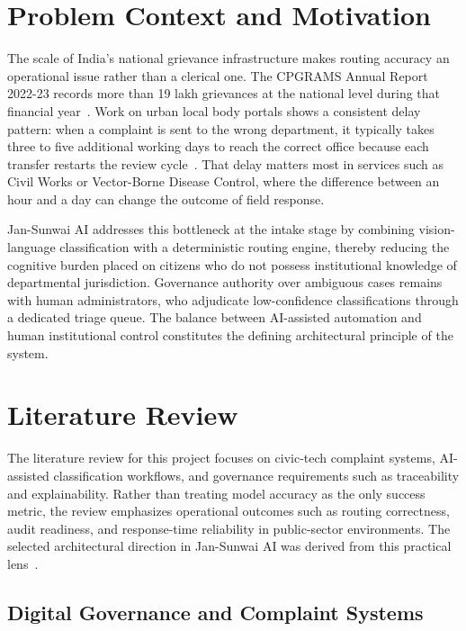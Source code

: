 \section{Problem Context and Motivation}

The scale of India's national grievance infrastructure makes routing accuracy an operational issue rather than a clerical one. The CPGRAMS Annual Report 2022-23 records more than 19 lakh grievances at the national level during that financial year~\cite{cpgrams_report}. Work on urban local body portals shows a consistent delay pattern: when a complaint is sent to the wrong department, it typically takes three to five additional working days to reach the correct office because each transfer restarts the review cycle~\cite{world_bank_digital_governance}. That delay matters most in services such as Civil Works or Vector-Borne Disease Control, where the difference between an hour and a day can change the outcome of field response.

Jan-Sunwai AI addresses this bottleneck at the intake stage by combining vision-language classification with a deterministic routing engine, thereby reducing the cognitive burden placed on citizens who do not possess institutional knowledge of departmental jurisdiction. Governance authority over ambiguous cases remains with human administrators, who adjudicate low-confidence classifications through a dedicated triage queue. The balance between AI-assisted automation and human institutional control constitutes the defining architectural principle of the system.

\section{Literature Review}

The literature review for this project focuses on civic-tech complaint systems, AI-assisted classification workflows, and governance requirements such as traceability and explainability. Rather than treating model accuracy as the only success metric, the review emphasizes operational outcomes such as routing correctness, audit readiness, and response-time reliability in public-sector environments. The selected architectural direction in Jan-Sunwai AI was derived from this practical lens~\cite{un_e_gov, world_bank_digital_governance, fielding_rest, hitl_ai}.

\subsection{Digital Governance and Complaint Systems}


